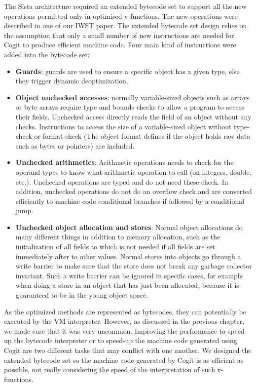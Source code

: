\documentclass[a4paper,12pt,twoside]{../includes/ThesisStyle}
\begin{document}
The Sista architecture required an extended bytecode set to support all the new operations permitted only in optimised v-functions. The new operations were described in one of our IWST paper\cite{Bera14a}. The extended bytecode set design relies on the assumption that only a small number of new instructions are needed for Cogit to produce efficient machine code. Four main kind of instructions were added into the bytecode set:
\begin{itemize}
\item \textbf{Guards}: guards are used to ensure a specific object has a given type, else they trigger dynamic deoptimization.
\item \textbf{Object unchecked accesses}: normally variable-sized objects such as arrays or byte arrays require type and bounds checks to allow a program to access their fields. Unchecked access directly reads the field of an object without any checks. Instructions to access the size of a variable-sized object without type-check or format-check (The object format defines if the object holds raw data such as bytes or pointers) are included.
\item \textbf{Unchecked arithmetics}: Arithmetic operations needs to check for the operand types to know what arithmetic operation to call (on integers, double, etc.). Unchecked operations are typed and do not need these check. In addition, unchecked operations do not do an overflow check and are converted efficiently to machine code conditional branches if followed by a conditional jump.
\item \textbf{Unchecked object allocation and stores}: Normal object allocations do many different things in addition to memory allocation, such as the initialization of all fields to  which is not needed if all fields are set immediately after to other values. Normal stores into objects go through a write barrier to make sure that the store does not break any garbage collector invariant. Such a write barrier can be ignored in specific cases, for example when doing a store in an object that has just been allocated, because it is guaranteed to be in the young object space.
\end{itemize}

As the optimized methods are represented as bytecodes, they can potentially be executed by the VM interpreter. However, as discussed in the previous chapter, we made sure that it was very uncommon. Improving the performance to speed-up the bytecode interpreter or to speed-up the machine code generated using Cogit are two different tasks that may conflict with one another. We designed the extended bytecode set so the machine code generated by Cogit is as efficient as possible, not really considering the speed of the interpretation of such v-functions.
\end{document}
